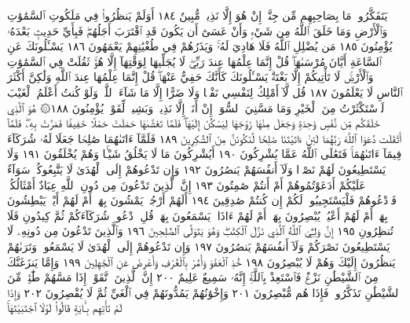 يَتَفَكَّرُوا۟ۗ مَا بِصَاحِبِهِم مِّن جِنَّةٍۚ إِنْ هُوَ إِلَّا نَذِيرࣱ مُّبِينٌ ١٨٤
أَوَلَمْ يَنظُرُوا۟ فِي مَلَكُوتِ ٱلسَّمَٰوَٰتِ وَٱلْأَرْضِ وَمَا خَلَقَ ٱللَّهُ
مِن شَيْءࣲ وَأَنْ عَسَىٰٓ أَن يَكُونَ قَدِ ٱقْتَرَبَ أَجَلُهُمْۖ فَبِأَيِّ حَدِيثِۭ
بَعْدَهُۥ يُؤْمِنُونَ ١٨٥ مَن يُضْلِلِ ٱللَّهُ فَلَا هَادِيَ لَهُۥۚ وَيَذَرُهُمْ
فِي طُغْيَٰنِهِمْ يَعْمَهُونَ ١٨٦ يَسْـَٔلُونَكَ عَنِ ٱلسَّاعَةِ أَيَّانَ مُرْسَىٰهَاۖ
قُلْ إِنَّمَا عِلْمُهَا عِندَ رَبِّيۖ لَا يُجَلِّيهَا لِوَقْتِهَآ إِلَّا هُوَۚ ثَقُلَتْ فِي
ٱلسَّمَٰوَٰتِ وَٱلْأَرْضِۚ لَا تَأْتِيكُمْ إِلَّا بَغْتَةࣰۗ يَسْـَٔلُونَكَ كَأَنَّكَ حَفِيٌّ عَنْهَاۖ
قُلْ إِنَّمَا عِلْمُهَا عِندَ ٱللَّهِ وَلَٰكِنَّ أَكْثَرَ ٱلنَّاسِ لَا يَعْلَمُونَ ١٨٧
قُل لَّآ أَمْلِكُ لِنَفْسِي نَفْعࣰا وَلَا ضَرًّا إِلَّا مَا شَآءَ ٱللَّهُۚ وَلَوْ كُنتُ
أَعْلَمُ ٱلْغَيْبَ لَٱسْتَكْثَرْتُ مِنَ ٱلْخَيْرِ وَمَا مَسَّنِيَ ٱلسُّوٓءُۚ
إِنْ أَنَا۠ إِلَّا نَذِيرࣱ وَبَشِيرࣱ لِّقَوْمࣲ يُؤْمِنُونَ ١٨٨۞ هُوَ ٱلَّذِي خَلَقَكُم
مِّن نَّفْسࣲ وَٰحِدَةࣲ وَجَعَلَ مِنْهَا زَوْجَهَا لِيَسْكُنَ إِلَيْهَاۖ فَلَمَّا
تَغَشَّىٰهَا حَمَلَتْ حَمْلًا خَفِيفࣰا فَمَرَّتْ بِهِۦۖ فَلَمَّآ أَثْقَلَت دَّعَوَا
ٱللَّهَ رَبَّهُمَا لَئِنْ ءَاتَيْتَنَا صَٰلِحࣰا لَّنَكُونَنَّ مِنَ ٱلشَّٰكِرِينَ ١٨٩
فَلَمَّآ ءَاتَىٰهُمَا صَٰلِحࣰا جَعَلَا لَهُۥ شُرَكَآءَ فِيمَآ ءَاتَىٰهُمَاۚ فَتَعَٰلَى
ٱللَّهُ عَمَّا يُشْرِكُونَ ١٩٠ أَيُشْرِكُونَ مَا لَا يَخْلُقُ شَيْـࣰٔا وَهُمْ يُخْلَقُونَ ١٩١
وَلَا يَسْتَطِيعُونَ لَهُمْ نَصْرࣰا وَلَآ أَنفُسَهُمْ يَنصُرُونَ ١٩٢
وَإِن تَدْعُوهُمْ إِلَى ٱلْهُدَىٰ لَا يَتَّبِعُوكُمْۚ سَوَآءٌ عَلَيْكُمْ أَدَعَوْتُمُوهُمْ
أَمْ أَنتُمْ صَٰمِتُونَ ١٩٣ إِنَّ ٱلَّذِينَ تَدْعُونَ مِن دُونِ ٱللَّهِ عِبَادٌ
أَمْثَالُكُمْۖ فَٱدْعُوهُمْ فَلْيَسْتَجِيبُوا۟ لَكُمْ إِن كُنتُمْ
صَٰدِقِينَ ١٩٤ أَلَهُمْ أَرْجُلࣱ يَمْشُونَ بِهَآۖ أَمْ لَهُمْ أَيْدࣲ يَبْطِشُونَ
بِهَآۖ أَمْ لَهُمْ أَعْيُنࣱ يُبْصِرُونَ بِهَآۖ أَمْ لَهُمْ ءَاذَانࣱ يَسْمَعُونَ
بِهَاۗ قُلِ ٱدْعُوا۟ شُرَكَآءَكُمْ ثُمَّ كِيدُونِ فَلَا تُنظِرُونِ ١٩٥
إِنَّ وَلِـِّۧيَ ٱللَّهُ ٱلَّذِي نَزَّلَ ٱلْكِتَٰبَۖ وَهُوَ يَتَوَلَّى ٱلصَّٰلِحِينَ ١٩٦
وَٱلَّذِينَ تَدْعُونَ مِن دُونِهِۦ لَا يَسْتَطِيعُونَ نَصْرَكُمْ
وَلَآ أَنفُسَهُمْ يَنصُرُونَ ١٩٧ وَإِن تَدْعُوهُمْ إِلَى ٱلْهُدَىٰ لَا يَسْمَعُوا۟ۖ
وَتَرَىٰهُمْ يَنظُرُونَ إِلَيْكَ وَهُمْ لَا يُبْصِرُونَ ١٩٨ خُذِ ٱلْعَفْوَ
وَأْمُرْ بِٱلْعُرْفِ وَأَعْرِضْ عَنِ ٱلْجَٰهِلِينَ ١٩٩ وَإِمَّا يَنزَغَنَّكَ
مِنَ ٱلشَّيْطَٰنِ نَزْغࣱ فَٱسْتَعِذْ بِٱللَّهِۚ إِنَّهُۥ سَمِيعٌ عَلِيمٌ ٢٠٠ إِنَّ
ٱلَّذِينَ ٱتَّقَوْا۟ إِذَا مَسَّهُمْ طَٰٓئِفࣱ مِّنَ ٱلشَّيْطَٰنِ تَذَكَّرُوا۟
فَإِذَا هُم مُّبْصِرُونَ ٢٠١ وَإِخْوَٰنُهُمْ يَمُدُّونَهُمْ فِي ٱلْغَيِّ ثُمَّ
لَا يُقْصِرُونَ ٢٠٢ وَإِذَا لَمْ تَأْتِهِم بِـَٔايَةࣲ قَالُوا۟ لَوْلَا ٱجْتَبَيْتَهَاۚ
